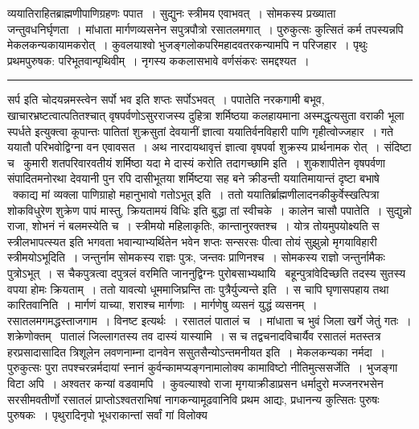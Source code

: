 \documentclass[11pt, openany]{book}
\begin{document}
\newpage

\noindent
व्ययातिराहितब्राह्मणीपाणिग्रहणः पपात~। सुद्युनः स्त्रीमय एवाभवत्~। सोमकस्य प्रख्याता जन्तुवधनिर्घृणता~। मांधाता मार्गणव्यसनेन सपुत्रपौत्रो रसातलमगात्~। पुरुकुत्सः कुत्सितं कर्म तपस्यन्नपि मेकलकन्यकायामकरोत्~। कुवलयाश्वो भुजङ्गलोकपरिमहादवतरकन्यामपि न परिजहार~। पृथुः प्रथमपुरुषक: परिभूतवान्पृथिवीम्~। नृगस्य ककलासभावे वर्णसंकरः समद्दश्यत~।

\vspace{2mm}
\hrule

\noindent
{\s सर्प इति चोदयन्नमस्त्वेन {\qt सर्पो भव} इति शप्तः सर्पोऽभवत्~। पपातेति नरकगामी बभूव, खाचारभ्रष्टत्वात्पतितश्चात् वृषपर्वणोऽसुरराजस्य दुहित्रा शर्मिष्ठया कलहायमाना {\qt अस्मद्धृत्यसुता वराकी भूला स्पर्धते} इत्युक्त्वा कूपान्तः पातितां शुक्रसुतां देवयानीं ज्ञात्वा ययातिर्वनविहारी पाणि गृहीत्वोज्जहार~। गते ययातौ परिभवोद्विग्ना वन एवावसत~। अथ नारदायथावृत्तं ज्ञात्वा वृषपर्वा शुक्रस्य प्रार्थनामक रोत्~। संदिष्टा च \textendash\ {\qt कुमारी शतपरिवारवतीयं शर्मिष्ठा यदा मे दास्यं करोति तदागच्छामि} इति~। शुकशापीतेन वृषपर्वणा संपादितमनोरथा देवयानी पुन रपि दासीभूतया शर्मिष्टया सह बने क्रीडन्ती ययातिमायान्तं दृष्टा बभाषे \textendash\ {\qt क्काद्य मां व्यक्ला पाणिग्राहो महानुभावो गतोऽभूत्} इति~। ततो ययातिर्ब्राह्मणीलादनकीकुर्वेस्खत्पित्रा शोकविधुरेण शुक्रेण पापं मास्तु, क्रियतामयं विधिः इति बुद्धा तां स्वीचके~। कालेन चासौ पपातेति~। सुद्युन्नो राजा, शोभनं नं बलमस्येति च~। स्त्रीमयो महिलाकृतिः, कान्तानुरक्तश्च~। योत्र तोयमुपयोक्ष्यति स स्त्रीलभापत्स्यत इति भगवता भवान्याभ्यर्थितेन भवेन शप्तः सन्सरसः पीत्वा तोयं सुझुन्नो मृगयाविहारी स्त्रीमयोऽभूदिति~। जन्तुर्नाम सोमकस्य राज्ञः पुत्रः, जन्तवः प्राणिनश्च~। सोमकस्य राज्ञो जन्तुर्नामैकः पुत्रोऽभूत्~। स चैकपुत्रत्वा दपुत्रलं वरमिति जाननुद्विग्नः पुरोबसाभ्यथायि \textendash\ बहून्पुत्रांवेदिच्छति तदस्य सुतस्य वपया होमः क्रियताम्~। ततो यावत्यो धूममाजिघ्रन्ति ताः पुत्रैर्युज्यन्ते इति~। स चापि घृणासपहाय तथा कारितवानिति~। मार्गणं याच्या, शराश्च मार्गणाः~। मार्गणेषु व्यसनं युद्धं व्यसनम्~। रसातलमगमद्धस्ताजगाम~। विनष्ट इत्यर्थः~। रसातलं पातालं च~। मांधाता च भुवं जिला खर्गे जेतुं गतः~। शक्रेणोक्तम् \textendash\ पातालं जिल्लागतस्य तव दास्यं यास्यामि~। स च तद्वचनादविचार्यैव रसातलं मतस्तत्र हरप्रसादासादित त्रिशूलेन लवणनाम्ना दानवेन ससुतसैन्योऽन्तमनीयत इति~। मेकलकन्यका नर्मदा~। पुरुकुत्सः पुरा तपश्चरन्नर्मदायां स्नानं कुर्वन्कामप्यङ्गनामालोक्य कामाविष्टो नीतिमुत्ससर्जेति~। भुजङ्गा विटा अपि~। अश्वतर कन्यां वडवामपि~। कुवल्याश्वो राजा मृगयाक्रीडाप्रसन धर्मादुरो मज्जनरभसेन सरसीमवतीर्णो रसातलं प्राप्तोऽश्वतराभिषां नागकन्यामूढवानिवि प्रथम आद्यः, प्रधानन्य कुत्सितः पुरुषः पुरुषकः~। पृथुरादिनृपो भूधराकान्तां सर्वां गां विलोक्य}
\end{document}

